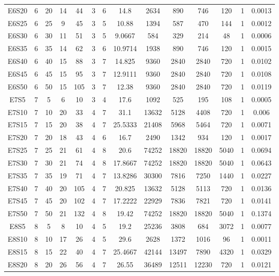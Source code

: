 \documentclass[letter, 10pt]{article}
\begin{document}
\begin{landscape}
\begin{longtable}{|c|c|c|c|c|c|c|c|c|c|c|c|c|c|}
E6S20 & 6 & 20 & 14 & 44 & 3 & 6 & 14.8 & 2634 & 890 & 746 & 120 & 1 & 0.0013 \\
E6S25 & 6 & 25 & 9 & 45 & 3 & 5 & 10.88 & 1394 & 587 & 470 & 144 & 1 & 0.0012 \\
E6S30 & 6 & 30 & 11 & 51 & 3 & 5 & 9.0667 & 584 & 329 & 214 & 48 & 1 & 0.0006 \\
E6S35 & 6 & 35 & 14 & 62 & 3 & 6 & 10.9714 & 1938 & 890 & 746 & 120 & 1 & 0.0015 \\
E6S40 & 6 & 40 & 15 & 88 & 3 & 7 & 14.825 & 9360 & 2840 & 2840 & 720 & 1 & 0.0102 \\
E6S45 & 6 & 45 & 15 & 95 & 3 & 7 & 12.9111 & 9360 & 2840 & 2840 & 720 & 1 & 0.0108 \\
E6S50 & 6 & 50 & 15 & 105 & 3 & 7 & 12.38 & 9360 & 2840 & 2840 & 720 & 1 & 0.0119 \\
E7S5 & 7 & 5 & 6 & 10 & 3 & 4 & 17.6 & 1092 & 525 & 195 & 108 & 1 & 0.0005 \\
E7S10 & 7 & 10 & 20 & 33 & 4 & 7 & 31.1 & 13632 & 5128 & 4408 & 720 & 1 & 0.006 \\
E7S15 & 7 & 15 & 20 & 38 & 4 & 7 & 25.5333 & 21408 & 5968 & 5464 & 720 & 1 & 0.0071 \\
E7S20 & 7 & 20 & 18 & 43 & 4 & 6 & 16.7 & 2490 & 1342 & 934 & 120 & 1 & 0.0017 \\
E7S25 & 7 & 25 & 21 & 61 & 4 & 8 & 20.6 & 74252 & 18820 & 18820 & 5040 & 1 & 0.0694 \\
E7S30 & 7 & 30 & 21 & 74 & 4 & 8 & 17.8667 & 74252 & 18820 & 18820 & 5040 & 1 & 0.0643 \\
E7S35 & 7 & 35 & 19 & 71 & 4 & 7 & 13.8286 & 30300 & 7816 & 7250 & 1440 & 1 & 0.0227 \\
E7S40 & 7 & 40 & 20 & 105 & 4 & 7 & 20.825 & 13632 & 5128 & 5113 & 720 & 1 & 0.0136 \\
E7S45 & 7 & 45 & 20 & 102 & 4 & 7 & 17.2222 & 22929 & 7836 & 7821 & 720 & 1 & 0.0141 \\
E7S50 & 7 & 50 & 21 & 132 & 4 & 8 & 19.42 & 74252 & 18820 & 18820 & 5040 & 1 & 0.1374 \\
E8S5 & 8 & 5 & 8 & 10 & 4 & 5 & 19.2 & 25236 & 3808 & 684 & 3072 & 1 & 0.0077 \\
E8S10 & 8 & 10 & 17 & 26 & 4 & 5 & 29.6 & 2628 & 1372 & 1016 & 96 & 1 & 0.0011 \\
E8S15 & 8 & 15 & 22 & 40 & 4 & 7 & 25.4667 & 42144 & 13497 & 7890 & 4320 & 1 & 0.0329 \\
E8S20 & 8 & 20 & 26 & 56 & 4 & 7 & 26.55 & 36489 & 12511 & 12230 & 720 & 1 & 0.0121 \\

\end{longtable}
\end{landscape}
\end{document}
